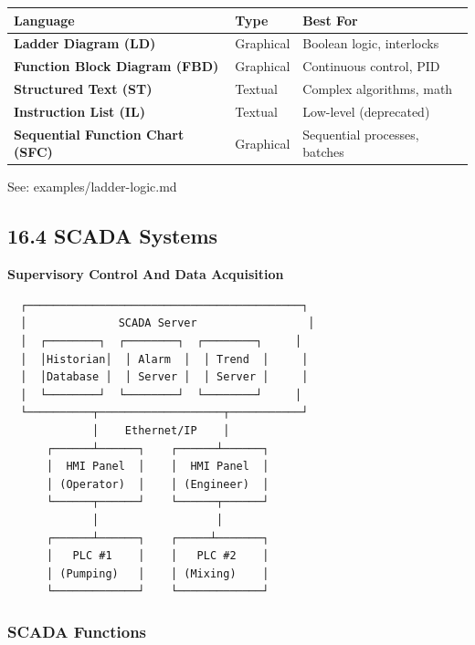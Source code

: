 \documentclass[11pt,a4paper]{book}
\begin{document}
\begin{itemize}
\begin{center}
\begin{tabular}{|l|l|l|}
\hline
Language & Type & Best For \\
\hline
\textbf{Ladder Diagram (LD)} & Graphical & Boolean logic, interlocks \\
\textbf{Function Block Diagram (FBD)} & Graphical & Continuous control, PID \\
\textbf{Structured Text (ST)} & Textual & Complex algorithms, math \\
\textbf{Instruction List (IL)} & Textual & Low-level (deprecated) \\
\textbf{Sequential Function Chart (SFC)} & Graphical & Sequential processes, batches \\
\hline
\end{tabular}
\end{center}

See: examples/ladder-logic.md

\medskip\noindent\hrulefill\medskip

\subsection{16.4 SCADA Systems}

\textbf{Supervisory Control And Data Acquisition}

\begin{lstlisting}
  ┌──────────────────────────────────────────┐
  │              SCADA Server                 │
  │  ┌────────┐  ┌────────┐  ┌────────┐     │
  │  │Historian│  │ Alarm  │  │ Trend  │     │
  │  │Database │  │ Server │  │ Server │     │
  │  └────────┘  └────────┘  └────────┘     │
  └──────────┬───────────────────┬───────────┘
             │    Ethernet/IP    │
      ┌──────┴──────┐    ┌──────┴──────┐
      │  HMI Panel  │    │  HMI Panel  │
      │ (Operator)  │    │ (Engineer)  │
      └──────┬──────┘    └──────┬──────┘
             │                  │
      ┌──────┴──────┐    ┌─────┴───────┐
      │   PLC #1    │    │   PLC #2    │
      │ (Pumping)   │    │ (Mixing)    │
      └─────────────┘    └─────────────┘
\end{lstlisting}

\subsubsection{SCADA Functions}


\end{itemize}
\end{document}
